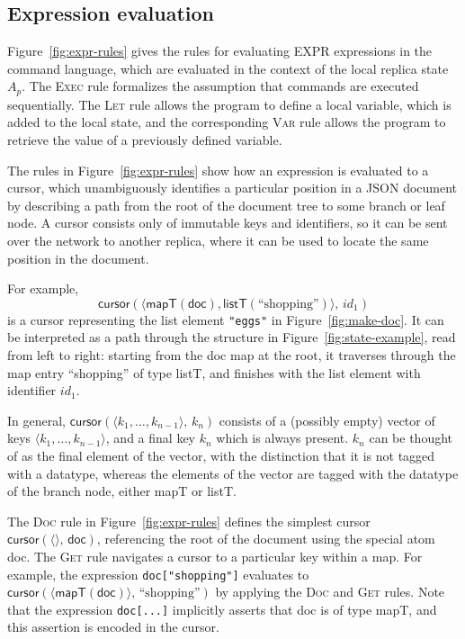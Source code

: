 \documentclass[10pt,journal,compsoc]{IEEEtran}
\begin{document}
\subsection{Expression evaluation}

Figure~\ref{fig:expr-rules} gives the rules for evaluating EXPR expressions in the command language, which are evaluated in the context of the local replica state $A_p$. The \textsc{Exec} rule formalizes the assumption that commands are executed sequentially. The \textsc{Let} rule allows the program to define a local variable, which is added to the local state, and the corresponding \textsc{Var} rule allows the program to retrieve the value of a previously defined variable.

The rules in Figure~\ref{fig:expr-rules} show how an expression is evaluated to a cursor, which unambiguously identifies a particular position in a JSON document by describing a path from the root of the document tree to some branch or leaf node. A cursor consists only of immutable keys and identifiers, so it can be sent over the network to another replica, where it can be used to locate the same position in the document.

For example,
\[ \mathsf{cursor}(\langle \mathsf{mapT}(\mathsf{doc}), \mathsf{listT}(\text{``shopping''}) \rangle,\, \mathit{id}_1) \]
is a cursor representing the list element \verb|"eggs"| in Figure~\ref{fig:make-doc}. It can be interpreted as a path through the structure in Figure~\ref{fig:state-example}, read from left to right: starting from the \textsf{doc} map at the root, it traverses through the map entry ``shopping'' of type \textsf{listT}, and finishes with the list element with identifier $\mathit{id}_1$.

In general, $\mathsf{cursor}(\langle k_1, \dots, k_{n-1} \rangle,\, k_n)$ consists of a (possibly empty) vector of keys $\langle k_1, \dots, k_{n-1} \rangle$, and a final key $k_n$ which is always present. $k_n$ can be thought of as the final element of the vector, with the distinction that it is not tagged with a datatype, whereas the elements of the vector are tagged with the datatype of the branch node, either \textsf{mapT} or \textsf{listT}.

The \textsc{Doc} rule in Figure~\ref{fig:expr-rules} defines the simplest cursor $\mathsf{cursor}(\langle\rangle,\, \mathsf{doc})$, referencing the root of the document using the special atom \textsf{doc}. The \textsc{Get} rule navigates a cursor to a particular key within a map. For example, the expression \verb|doc["shopping"]| evaluates to $\mathsf{cursor}(\langle \mathsf{mapT}(\mathsf{doc}) \rangle,\, \text{``shopping''})$ by applying the \textsc{Doc} and \textsc{Get} rules. Note that the expression \verb|doc[...]| implicitly asserts that \textsf{doc} is of type \textsf{mapT}, and this assertion is encoded in the cursor.
\end{document}
